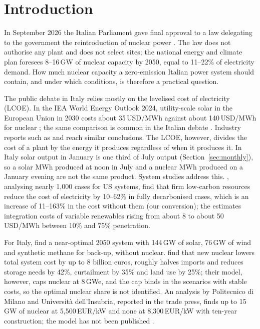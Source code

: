 \section{Introduction}\label{sec:intro}

In September 2026 the Italian Parliament gave final approval to a law delegating to the government the reintroduction of nuclear power \citep{Delega2026}. The law does not authorise any plant and does not select sites; the national energy and climate plan foresees 8--16\,GW of nuclear capacity by 2050, equal to 11--22\% of electricity demand. How much nuclear capacity a zero-emission Italian power system should contain, and under which conditions, is therefore a practical question.

The public debate in Italy relies mostly on the levelised cost of electricity (LCOE). In the IEA World Energy Outlook 2024, utility-scale solar in the European Union in 2030 costs about 35\,USD/MWh against about 140\,USD/MWh for nuclear \citep{IEA2024WEO}; the same comparison is common in the Italian debate \citep{Pagella2026}. Industry reports such as \citet{Lazard2025} and \citet{Fraunhofer2024} reach similar conclusions. The LCOE, however, divides the cost of a plant by the energy it produces regardless of when it produces it. In Italy solar output in January is one third of July output (Section~\ref{sec:monthly}), so a solar MWh produced at noon in July and a nuclear MWh produced on a January evening are not the same product. System studies address this. \citet{Sepulveda2018}, analysing nearly 1{,}000 cases for US systems, find that firm low-carbon resources reduce the cost of electricity by 10--62\% in fully decarbonised cases, which is an increase of 11--163\% in the cost without them (our conversion); the \citet{NEA2019} estimates integration costs of variable renewables rising from about 8 to about 50\,USD/MWh between 10\% and 75\% penetration.

For Italy, \citet{Lombardi2020} find a near-optimal 2050 system with 144\,GW of solar, 76\,GW of wind and synthetic methane for back-up, without nuclear. \citet{Mastrantuono2026} find that new nuclear lowers total system cost by up to 8 billion euros, roughly halves imports and reduces storage needs by 42\%, curtailment by 35\% and land use by 25\%; their model, however, caps nuclear at 8\,GWe, and the cap binds in the scenarios with stable costs, so the optimal nuclear share is not identified. An analysis by Politecnico di Milano and Universit\`a dell'Insubria, reported in the trade press, finds up to 15\,GW of nuclear at 5{,}500\,EUR/kW and none at 8{,}300\,EUR/kW with ten-year construction; the model has not been published \citep{PoliMi2026}.

